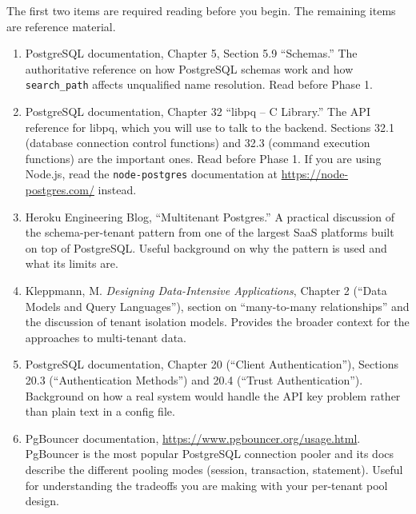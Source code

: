 \documentclass[11pt,a4paper]{article}
\begin{document}
The first two items are required reading before you begin. The remaining items are reference material.

\begin{enumerate}
\item PostgreSQL documentation, Chapter 5, Section 5.9 ``Schemas.'' The authoritative reference on how PostgreSQL schemas work and how \texttt{search\_path} affects unqualified name resolution. Read before Phase 1.

\item PostgreSQL documentation, Chapter 32 ``libpq -- C Library.'' The API reference for libpq, which you will use to talk to the backend. Sections 32.1 (database connection control functions) and 32.3 (command execution functions) are the important ones. Read before Phase 1. If you are using Node.js, read the \texttt{node-postgres} documentation at \url{https://node-postgres.com/} instead.

\item Heroku Engineering Blog, ``Multitenant Postgres.'' A practical discussion of the schema-per-tenant pattern from one of the largest SaaS platforms built on top of PostgreSQL. Useful background on why the pattern is used and what its limits are.

\item Kleppmann, M. \textit{Designing Data-Intensive Applications}, Chapter 2 (``Data Models and Query Languages''), section on ``many-to-many relationships'' and the discussion of tenant isolation models. Provides the broader context for the approaches to multi-tenant data.

\item PostgreSQL documentation, Chapter 20 (``Client Authentication''), Sections 20.3 (``Authentication Methods'') and 20.4 (``Trust Authentication''). Background on how a real system would handle the API key problem rather than plain text in a config file.

\item PgBouncer documentation, \url{https://www.pgbouncer.org/usage.html}. PgBouncer is the most popular PostgreSQL connection pooler and its docs describe the different pooling modes (session, transaction, statement). Useful for understanding the tradeoffs you are making with your per-tenant pool design.
\end{enumerate}

\footerboxes
\end{document}
